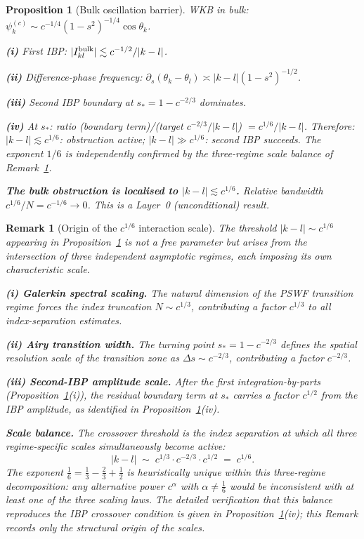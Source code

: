 \documentclass[12pt,a4paper]{article}
\newtheorem{proposition}[theorem]{Proposition}
\newtheorem{remark}[theorem]{Remark}
\newcommand{\pswf}[1]{\psi_{#1}^{(c)}}
\begin{document}
\begin{proposition}[Bulk oscillation barrier]\label{prop:bulk_barrier}
WKB in bulk: $\pswf{k}\sim c^{-1/4}(1-s^2)^{-1/4}\cos\theta_k$.

\textbf{(i)} First IBP: $|I_{kl}^{\rm bulk}|\lesssim c^{-1/2}/|k-l|$.

\textbf{(ii)} Difference-phase frequency:
$\partial_s(\theta_k-\theta_l)\asymp|k-l|(1-s^2)^{-1/2}$.

\textbf{(iii)} Second IBP boundary at $s_*=1-c^{-2/3}$ dominates.

\textbf{(iv)} At $s_*$: ratio (boundary term)/(target $c^{-2/3}/|k-l|$)
$= c^{1/6}/|k-l|$.
Therefore:
$|k-l|\lesssim c^{1/6}$: obstruction active;
$|k-l|\gg c^{1/6}$: second IBP succeeds.
The exponent $1/6$ is independently confirmed by the
three-regime scale balance of Remark~\ref{rem:c16_scale}.

\medskip\noindent
\textbf{The bulk obstruction is localised to $|k-l|\lesssim c^{1/6}$.}
Relative bandwidth $c^{1/6}/N=c^{-1/6}\to0$.
This is a Layer~0 (unconditional) result.
\end{proposition}

\begin{remark}[Origin of the $c^{1/6}$ interaction scale]
\label{rem:c16_scale}
The threshold $|k-l|\sim c^{1/6}$ appearing in
Proposition~\ref{prop:bulk_barrier} is not a free parameter
but arises from the intersection of three independent
asymptotic regimes, each imposing its own characteristic scale.

\medskip\noindent
\textbf{(i) Galerkin spectral scaling.}
The natural dimension of the PSWF transition regime forces
the index truncation $N\sim c^{1/3}$, contributing a factor
$c^{1/3}$ to all index-separation estimates.

\medskip\noindent
\textbf{(ii) Airy transition width.}
The turning point $s_*=1-c^{-2/3}$ defines the spatial
resolution scale of the transition zone as $\Delta s\sim c^{-2/3}$,
contributing a factor $c^{-2/3}$.

\medskip\noindent
\textbf{(iii) Second-IBP amplitude scale.}
After the first integration-by-parts
(Proposition~\ref{prop:bulk_barrier}(i)), the residual
boundary term at $s_*$ carries a factor $c^{1/2}$
from the IBP amplitude, as identified in
Proposition~\ref{prop:bulk_barrier}(iv).

\medskip\noindent
\textbf{Scale balance.}
The crossover threshold is the index separation at which
all three regime-specific scales simultaneously become active:
\[
  |k-l| \;\sim\; c^{1/3} \cdot c^{-2/3} \cdot c^{1/2}
  \;=\; c^{1/6}.
\]
The exponent $\tfrac{1}{6} = \tfrac{1}{3} - \tfrac{2}{3}
+ \tfrac{1}{2}$ is heuristically unique within this
three-regime decomposition: any alternative power $c^\alpha$
with $\alpha\neq\tfrac{1}{6}$ would be inconsistent with
at least one of the three scaling laws.
The detailed verification that this balance reproduces
the IBP crossover condition is given in
Proposition~\ref{prop:bulk_barrier}(iv);
this Remark records only the structural origin of the scales.
\end{remark}
\end{document}
